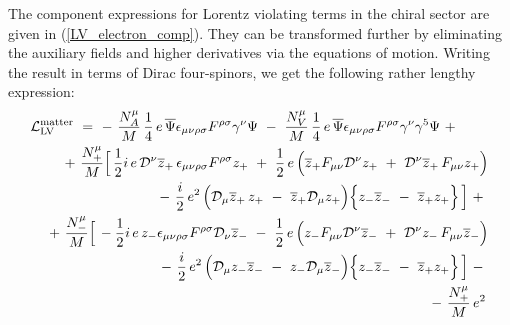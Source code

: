 \documentclass[12pt]{revtex4}
\newcommand{\slashed}[1]{\hbox{{$#1$}\llap{$/$}}}
\begin{document}
The component expressions for Lorentz violating terms in the chiral sector 
are given
in (\ref{LV_electron_comp}). They can be transformed further 
by eliminating the auxiliary fields and higher derivatives 
via the equations of motion. Writing the result in terms of Dirac
four-spinors, we get the following rather lengthy expression:
\begin{eqnarray}
\nonumber
\lefteqn{
     \mathcal{L}_{\mathrm{LV}}^{\mathrm{matter}}  ~= 
~      %
-~
\frac{N_A^\mu}{M}\,
\frac{1}{4} \,e\,
\overline{\Psi} \epsilon_{\mu\nu\rho\sigma}
F^{\rho\sigma} \gamma^\nu \Psi      
~-~
\frac{N_V^\mu}{M}\,
\frac{1}{4} \,e\,
\overline{\Psi} \epsilon_{\mu\nu\rho\sigma}
F^{\rho\sigma} \gamma^\nu \gamma^5 \Psi 
~+~ 
}\\
\nonumber
&&
~+~
\frac{N_+^\mu}{M}
\Big[\,
\frac{1}{2}i \,e \, 
\mathcal{D}^\nu \overline{z}_+ \,
\epsilon_{\mu\nu\rho\sigma}F^{\rho\sigma} z_+ 
~+~
\frac{1}{2}\, e\,
\Big(
  \overline{z}_+ F_{\mu\nu}
  \mathcal{D}^\nu z_+ 
  ~+~
  \mathcal{D}^\nu \overline{z}_+ \,
  F_{\mu\nu} z_+
\Big) 
\\
\nonumber
&&
               \qquad
~-~
\frac{i}{2}\, e^2\,
\Big(
  \mathcal{D}_\mu \overline{z}_+ \,
   z_+ 
  ~-~
  \overline{z}_+ \mathcal{D}_\mu z_+
\Big)
\Big\{
  z_-  \overline{z}_- 
  ~-~
  \overline{z}_+  z_+
\Big\}
\,\Big] ~+~ \\
\nonumber
&&
~+~
\frac{N_-^\mu}{M}
\Big[\,
- \frac{1}{2} i\, e\,
z_- \epsilon_{\mu\nu\rho\sigma}F^{\rho\sigma}
\mathcal{D}_\nu \overline{z}_- 
~-~
\frac{1}{2}\, e\,
\Big(
  z_- F_{\mu\nu}\mathcal{D}^\nu \overline{z}_- 
  ~+~
  \mathcal{D}^\nu z_- \,
  F_{\mu\nu} \overline{z}_- 
\Big)
\\
\nonumber
&&
               \qquad
~-~ 
\frac{i}{2}\, e^2\,
\Big(
  \mathcal{D}_\mu z_- \overline{z}_-
  ~-~
  z_- \mathcal{D}_\mu \overline{z}_-
\Big)
\Big\{
  z_- \overline{z}_- 
  ~-~
  \overline{z}_+ z_+
\Big\}
\,\Big]
~-~ \\
\nonumber
&&
~-~
\frac{N_+^\mu}{M}\, e^2\,

\end{eqnarray}
\end{document}
